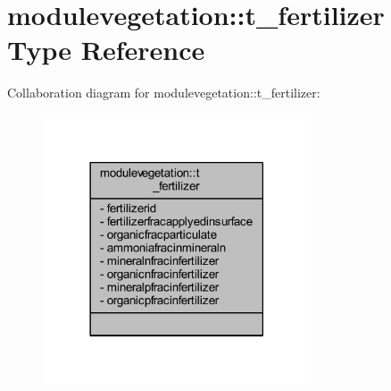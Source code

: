 \hypertarget{structmodulevegetation_1_1t__fertilizer}{}\section{modulevegetation\+:\+:t\+\_\+fertilizer Type Reference}
\label{structmodulevegetation_1_1t__fertilizer}


Collaboration diagram for modulevegetation\+:\+:t\+\_\+fertilizer\+:\nopagebreak
\begin{figure}[H]
\begin{center}
\leavevmode
\includegraphics[width=225pt]{structmodulevegetation_1_1t__fertilizer__coll__graph}
\end{center}
\end{figure}
